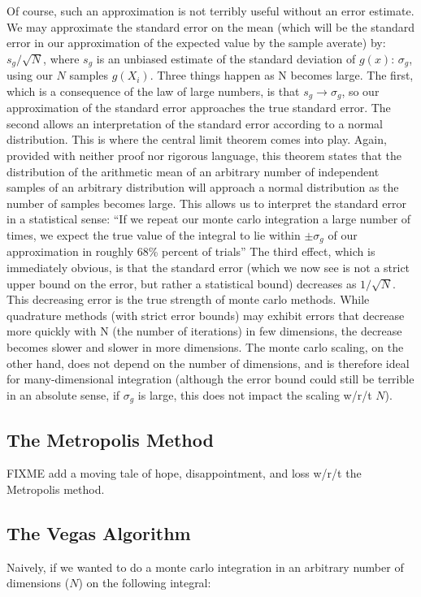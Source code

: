 \documentclass[10pt,letterpaper]{article}
\begin{document}
Of course, such an approximation is not terribly useful without an error estimate. We may approximate the standard error on the mean (which will be the standard error in our approximation of the expected value by the sample averate) by: $s_g / \sqrt{N}$, where $s_g$ is an unbiased estimate of the standard deviation of $g(x)$: $\sigma_g$, using our $N$ samples $g(X_i)$.
Three things happen as N becomes large. The first, which is a consequence of the law of large numbers, is that $s_g \rightarrow \sigma_g$, so our approximation of the standard error approaches the true standard error.
The second allows an interpretation of the standard error according to a normal distribution. This is where the central limit theorem comes into play. Again, provided with neither proof nor rigorous language, this theorem states that the distribution of the arithmetic mean of an arbitrary number of independent samples of an arbitrary distribution will approach a normal distribution as the number of samples becomes large. This allows us to interpret the standard error in a statistical sense: ``If  we repeat our monte carlo integration a large number of times, we expect the true value of the integral to lie within $\pm \sigma_g$ of our approximation in roughly 68\% percent of trials''
The third effect, which is immediately obvious, is that the standard error (which we now see is not a strict upper bound on the error, but rather a statistical bound) decreases as $1/\sqrt{N}$.
This decreasing error is the true strength of monte carlo methods. While quadrature methods (with strict error bounds) may exhibit errors that decrease more quickly with N (the number of iterations) in few dimensions, the decrease becomes slower and slower in more dimensions. The monte carlo scaling, on the other hand, does not depend on the number of dimensions, and is therefore ideal for many-dimensional integration (although the error bound could still be terrible in an absolute sense, if $\sigma_g$ is large, this does not impact the scaling w/r/t $N$).

\subsection{The Metropolis Method}

FIXME add a moving tale of hope, disappointment, and loss w/r/t the Metropolis method.


\subsection{The Vegas Algorithm}
\par Naively, if we wanted to do a monte carlo integration in an arbitrary number of dimensions ($N$) on the following integral:
\end{document}
